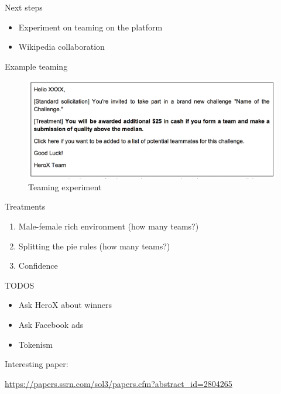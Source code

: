 \begin{frame}{Next steps}

\begin{itemize}
\tightlist
\item
  Experiment on teaming on the platform
\item
  Wikipedia collaboration
\end{itemize}

\end{frame}

\begin{frame}{Example teaming}

\begin{figure}
\centering
\includegraphics{solicit_teaming.png}
\caption{Teaming experiment}
\end{figure}

\end{frame}

\begin{frame}{Treatments}

\begin{enumerate}
\def\labelenumi{\arabic{enumi}.}
\tightlist
\item
  Male-female rich environment (how many teams?)
\item
  Splitting the pie rules (how many teams?)
\item
  Confidence
\end{enumerate}

\end{frame}

\begin{frame}{TODOS}

\begin{itemize}
\item
  Ask HeroX about winners
\item
  Ask Facebook ads
\item
  Tokenism
\end{itemize}

Interesting paper:

\url{https://papers.ssrn.com/sol3/papers.cfm?abstract_id=2804265}

\end{frame}
